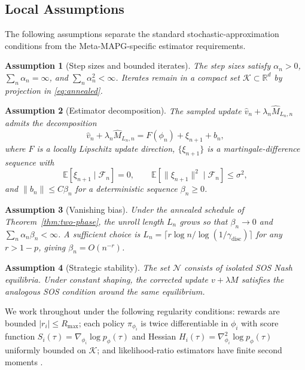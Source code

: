\documentclass{nextgame2026} %
\newtheorem{assumption}{Assumption}
\begin{document}
\subsection{Local Assumptions}\label{sec:assumptions}

The following assumptions separate the standard stochastic-approximation 
conditions from the Meta-MAPG-specific estimator requirements.

\begin{assumption}[Step sizes and bounded iterates]\label{as:steps}
The step sizes satisfy $\alpha_n > 0$, $\sum_n \alpha_n = \infty$, and 
$\sum_n \alpha_n^2 < \infty$. Iterates remain in a compact set 
$\mathcal{K} \subset \mathbb{R}^d$ by projection in \eqref{eq:annealed}.
\end{assumption}


\begin{assumption}[Estimator decomposition]\label{as:decomp}
The sampled update $\hat{v}_n + \lambda_n \widehat{M}_{L_n,n}$ admits 
the decomposition
\[
\hat{v}_n + \lambda_n \widehat{M}_{L_n,n} = F(\phi_n) + \xi_{n+1} + b_n,
\]
where $F$ is a locally Lipschitz update direction, $\{\xi_{n+1}\}$ is a 
martingale-difference sequence with
\[
\mathbb{E}[\xi_{n+1} \mid \mathcal{F}_n] = 0, \qquad 
\mathbb{E}[\|\xi_{n+1}\|^2 \mid \mathcal{F}_n] \leq \sigma^2,
\]
and $\|b_n\| \leq C\beta_n$ for a deterministic sequence $\beta_n \geq 0$.
\end{assumption}

\begin{assumption}[Vanishing bias]\label{as:trunc}
Under the annealed schedule of Theorem~\ref{thm:two-phase}, the unroll 
length $L_n$ grows so that $\beta_n \to 0$ and 
$\sum_n \alpha_n \beta_n < \infty$. A sufficient choice is 
$L_n = \lceil r \log n / \log(1/\gamma_{\mathrm{disc}}) \rceil$ for 
any $r > 1 - p$, giving $\beta_n = O(n^{-r})$.
\end{assumption}

\begin{assumption}[Strategic stability]\label{as:stable}
The set $\mathcal{N}$ consists of isolated SOS Nash equilibria. Under constant shaping, the corrected update $v + \lambda M$ satisfies the analogous SOS condition around the same equilibrium.
\end{assumption}

We work throughout under the following regularity conditions: rewards are 
bounded $|r_i| \leq R_{\max}$; each policy $\pi_{\phi_i}$ is twice 
differentiable in $\phi_i$ with score function $S_i(\tau) = 
\nabla_{\phi_i} \log p_\phi(\tau)$ and Hessian $H_i(\tau) = 
\nabla^2_{\phi_i} \log p_\phi(\tau)$ uniformly bounded on $\mathcal{K}$; 
and likelihood-ratio estimators have finite second moments 
\citep{williams1992simple, sutton2018reinforcement}.
\end{document}
